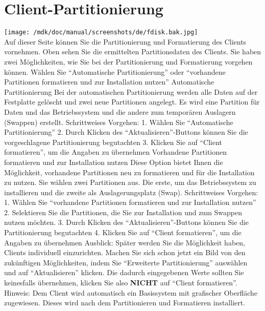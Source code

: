 \section{Client-Partitionierung}
\texttt{[image: /mdk/doc/manual/screenshots/de/fdisk.bak.jpg]} \\
 Auf dieser Seite k\"onnen Sie die Partitionierung und Formatierung des Clients vornehmen. Oben sehen Sie die ermittelten Partitionsdaten des Clients. Sie haben zwei M\"oglichkeiten, wie Sie bei der Partitionierung und Formatierung vorgehen k\"onnen. W\"ahlen Sie ``Automatische Partitionierung'' oder ``vorhandene Partitionen formatieren und zur Installation nutzen'' Automatische Partitionierung Bei der automatischen Partitionierung werden alle Daten auf der Festplatte gel\"oscht und zwei neue Partitionen angelegt. Es wird eine Partition f\"ur Daten und das Betriebssystem und die andere zum tempor\"aren Auslagern (Swappen) erstellt. Schrittweises Vorgehen: 1. W\"ahlen Sie ``Automatische Partitionierung'' 2. Durch Klicken des ``Aktualisieren''-Buttons k\"onnen Sie die vorgeschlagene Partitionierung begutachten 3. Klicken Sie auf ``Client formatieren'', um die Angaben zu \"ubernehmen Vorhandene Partitionen formatieren und zur Installation nutzen Diese Option bietet Ihnen die M\"oglichkeit, vorhandene Partitionen neu zu formatieren und f\"ur die Installation zu nutzen. Sie w\"ahlen zwei Partitionen aus. Die erste, um das Betriebssystem zu installieren und die zweite als Auslagerungsplatz (Swap). Schrittweises Vorgehen: 1. W\"ahlen Sie ``vorhandene Partitionen formatieren und zur Installation nutzen'' 2. Selektieren Sie die Partitionen, die Sie zur Installation und zum Swappen nutzen m\"ochten. 3. Durch Klicken des ``Aktualisieren''-Buttons k\"onnen Sie die Partitionierung begutachten 4. Klicken Sie auf ``Client formatieren'', um die Angaben zu \"ubernehmen Ausblick: Sp\"ater werden Sie die M\"oglichkeit haben, Clients individuell einzurichten. Machen Sie sich schon jetzt ein Bild von den zuk\"unftigen M\"oglichkeiten, indem Sie ``Erweiterte Partitionierung'' ausw\"ahlen und auf ``Aktualisieren'' klicken. Die dadurch eingegebenen Werte sollten Sie keinesfalls \"ubernehmen, klicken Sie also \textbf{NICHT}
 auf ``Client formatieren''. Hinweis: Dem Client wird automatisch ein Basissystem mit grafischer Oberfl\"ache zugewiesen. Dieses wird nach dem Partitionieren und Formatieren installiert. 

